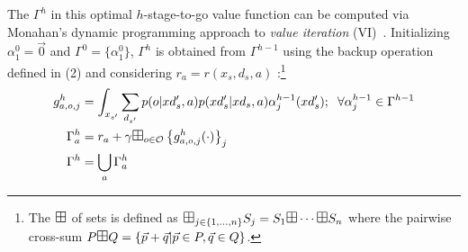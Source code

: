 \documentclass{article} %
\begin{document}
The $\Gamma^h$ in this optimal $h$-stage-to-go value function can be
computed via Monahan's dynamic programming approach to \emph{value
iteration} (VI)~\cite{monahan82}.  
Initializing  $\alpha^0_1 = \vec{0}$ and $\Gamma^0 = \{ \alpha^0_1 \}$, $\Gamma^h$ is obtained from $\Gamma^{h-1}$ using the backup operation defined in (2) and considering $r_a = r(x_s,d_s,a)$ :\footnote{The $\textrm{\large $\boxplus$}$ of sets is defined as 
$\textrm{\large $\boxplus$}_{j \in \{ 1,\ldots, n \} } S_j = S_1 \textrm{\large $\boxplus$} \cdots \textrm{\large $\boxplus$} S_n$ where the pairwise cross-sum $P 
\textrm{\large $\boxplus$} Q = \{ \vec{p} + \vec{q} | \vec{p} \in P, \vec{q} \in Q \}$.}
{\footnotesize
\begin{align} 
g^h_{a,o,j} &=  \int_{x_{s'}} \sum_{d_{s'}} p(o|xd'_s,a)p(xd'_s|xd_s,a) \alpha^{h-1}_j(xd'_s) ; \hspace{2mm}  \forall \alpha^{h-1}_{j} \in \Gamma^{h-1} \label{eq:backup} \\
\Gamma^{h}_a   &= r_a + \gamma \textrm{\large $\boxplus$}_{o \in \mathcal{O}} \left\{ g^h_{a,o,j}(\cdot) \right\}_j  \label{eq:cross_prod}\\ 
\Gamma^h  &= \bigcup_a \Gamma^h_a 
\end{align}
}
\vspace{-3mm}
\incmargin{.5em}
\linesnumbered
\end{document}
